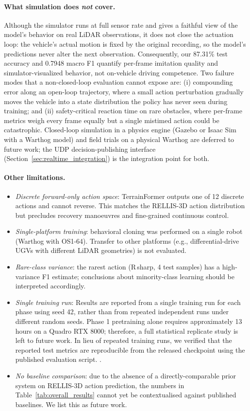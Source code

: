 \documentclass[sensors,article,submit,pdftex,moreauthors]{Definitions/mdpi}
\begin{document}
\paragraph{What simulation does \emph{not} cover.}
Although the simulator runs at full sensor rate and gives a faithful view of the model's behavior on real LiDAR observations, it does not close the actuation loop: the vehicle's actual motion is fixed by the original recording, so the model's predictions never alter the next observation. Consequently, our 87.31\% test accuracy and 0.7948 macro F1 quantify per-frame imitation quality and simulator-visualized behavior, not on-vehicle driving competence. Two failure modes that a non-closed-loop evaluation cannot expose are: (i) compounding error along an open-loop trajectory, where a small action perturbation gradually moves the vehicle into a state distribution the policy has never seen during training; and (ii) safety-critical reaction time on rare obstacles, where per-frame metrics weigh every frame equally but a single mistimed action could be catastrophic. Closed-loop simulation in a physics engine (Gazebo or Isaac Sim with a Warthog model) and field trials on a physical Warthog are deferred to future work; the UDP decision-publishing interface (Section~\ref{sec:realtime_integration}) is the integration point for both.

\paragraph{Other limitations.}
\begin{itemize}
    \item \emph{Discrete forward-only action space}: TerrainFormer outputs one of 12 discrete actions and cannot reverse. This matches the RELLIS-3D action distribution but precludes recovery manoeuvres and fine-grained continuous control.
    \item \emph{Single-platform training}: behavioral cloning was performed on a single robot (Warthog with OS1-64). Transfer to other platforms (e.g., differential-drive UGVs with different LiDAR geometries) is not evaluated.
    \item \emph{Rare-class variance}: the rarest action (R\,sharp, 4 test samples) has a high-variance F1 estimate; conclusions about minority-class learning should be interpreted accordingly.
    \item \emph{Single training run}: Results are reported from a single training run for each phase using seed 42, rather than from repeated independent runs under different random seeds. Phase 1 pretraining alone requires approximately 13 hours on a Quadro RTX 8000; therefore, a full statistical replicate study is left to future work. In lieu of repeated training runs, we verified that the reported test metrics are reproducible from the released checkpoint using the published evaluation script.
.
    \item \emph{No baseline comparison}: due to the absence of a directly-comparable prior system on RELLIS-3D action prediction, the numbers in Table~\ref{tab:overall_results} cannot yet be contextualised against published baselines. We list this as future work.
\end{itemize}
\end{document}

